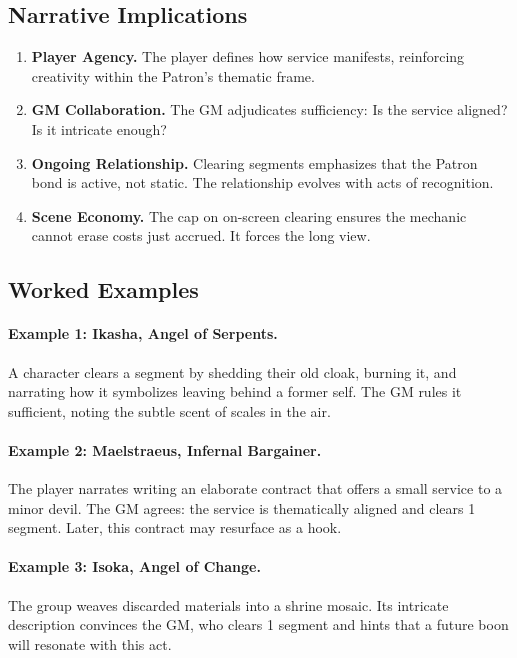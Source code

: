 \subsection{Narrative Implications}\label{subsec:obligation-implications}
\begin{enumerate}
\item \textbf{Player Agency.} The player defines how service manifests, reinforcing creativity within the Patron’s thematic frame.
\item \textbf{GM Collaboration.} The GM adjudicates sufficiency: Is the service aligned? Is it intricate enough?
\item \textbf{Ongoing Relationship.} Clearing segments emphasizes that the Patron bond is active, not static. The relationship evolves with acts of recognition.
\item \textbf{Scene Economy.} The cap on on-screen clearing ensures the mechanic cannot erase costs just accrued. It forces the long view.
\end{enumerate}

\subsection{Worked Examples}\label{subsec:obligation-examples}
\paragraph{Example 1: Ikasha, Angel of Serpents.} A character clears a segment by shedding their old cloak, burning it, and narrating how it symbolizes leaving behind a former self. The GM rules it sufficient, noting the subtle scent of scales in the air.

\paragraph{Example 2: Maelstraeus, Infernal Bargainer.} The player narrates writing an elaborate contract that offers a small service to a minor devil. The GM agrees: the service is thematically aligned and clears 1 segment. Later, this contract may resurface as a hook.

\paragraph{Example 3: Isoka, Angel of Change.} The group weaves discarded materials into a shrine mosaic. Its intricate description convinces the GM, who clears 1 segment and hints that a future boon will resonate with this act.

